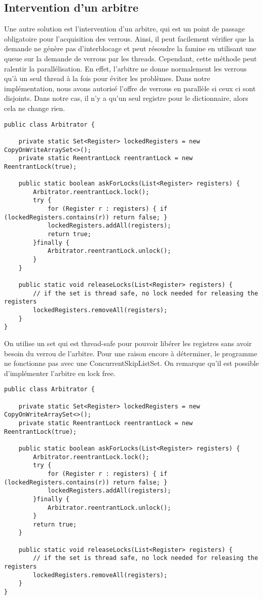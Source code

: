 \documentclass[10pt, a4paper]{article}
\begin{document}
\subsection{Intervention d'un arbitre}
Une autre solution est l'intervention d'un arbitre, qui est un point de passage obligatoire pour l'acquisition des verrous. Ainsi, il peut facilement vérifier que la demande ne génère pas d'interblocage et peut résoudre la famine en utilisant une queue sur la demande de verrous par les threads. Cependant, cette méthode peut ralentir la parallélisation. En effet, l'arbitre ne donne normalement les verrous qu'à un seul thread à la fois pour éviter les problèmes. Dans notre implémentation, nous avons autorisé l'offre de verrous en parallèle si ceux ci sont disjoints. Dans notre cas, il n'y a qu'un seul registre pour le dictionnaire, alors cela ne change rien. 

\begin{lstlisting}
public class Arbitrator {

    private static Set<Register> lockedRegisters = new CopyOnWriteArraySet<>();
    private static ReentrantLock reentrantLock = new ReentrantLock(true);

    public static boolean askForLocks(List<Register> registers) {
        Arbitrator.reentrantLock.lock();
        try {
            for (Register r : registers) { if (lockedRegisters.contains(r)) return false; }
            lockedRegisters.addAll(registers);
            return true;
        }finally {
            Arbitrator.reentrantLock.unlock();
        }
    }

    public static void releaseLocks(List<Register> registers) {
        // if the set is thread safe, no lock needed for releasing the registers
        lockedRegisters.removeAll(registers);
    }
}
\end{lstlisting}

On utilise un set qui est thread-safe pour pouvoir libérer les registres sans avoir besoin du verrou de l'arbitre. Pour une raison encore à déterminer, le programme ne fonctionne pas avec une ConcurrentSkipListSet. On remarque qu'il est possible d'implémenter l'arbitre en lock free. 

\begin{lstlisting}
public class Arbitrator {

    private static Set<Register> lockedRegisters = new CopyOnWriteArraySet<>();
    private static ReentrantLock reentrantLock = new ReentrantLock(true);

    public static boolean askForLocks(List<Register> registers) {
        Arbitrator.reentrantLock.lock();
        try {
            for (Register r : registers) { if (lockedRegisters.contains(r)) return false; }
            lockedRegisters.addAll(registers);
        }finally {
            Arbitrator.reentrantLock.unlock();
        }
        return true;
    }

    public static void releaseLocks(List<Register> registers) {
        // if the set is thread safe, no lock needed for releasing the registers
        lockedRegisters.removeAll(registers);
    }
}
\end{lstlisting}



		
\end{document}
